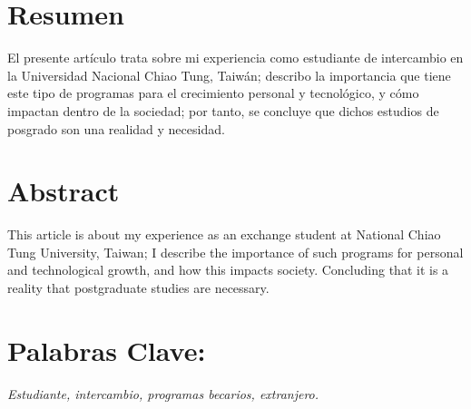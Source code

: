 \documentclass[12pt,spanish,Letterpaper,openany]{book}
\begin{document}
\hypertarget{resumen-2}{%
\section*{Resumen}\label{resumen-2}}

El presente artículo trata sobre mi experiencia como estudiante de intercambio en la Universidad Nacional Chiao Tung, Taiwán; describo la importancia que tiene este tipo de programas para el crecimiento personal y tecnológico, y cómo impactan dentro de la sociedad; por tanto, se concluye que dichos estudios de posgrado son una realidad y necesidad.

\hypertarget{abstract-2}{%
\section*{Abstract}\label{abstract-2}}

This article is about my experience as an exchange student at National Chiao Tung University, Taiwan; I describe the importance of such programs for personal and technological growth, and how this impacts society. Concluding that it is a reality that postgraduate studies are necessary.

\hypertarget{palabras-clave-3}{%
\section*{Palabras Clave:}\label{palabras-clave-3}}

\emph{Estudiante, intercambio, programas becarios, extranjero.}
\end{document}
